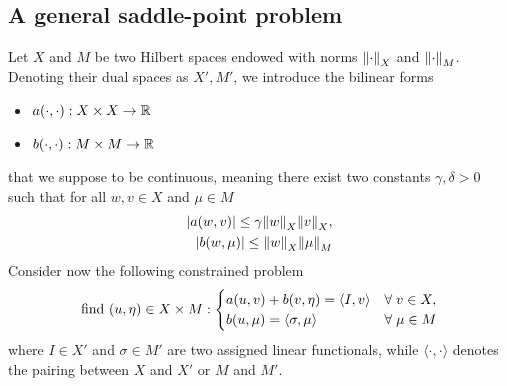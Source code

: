 \subsection{A general saddle-point problem}
Let \(X\) and \(M\) be two Hilbert spaces endowed with norms \(\norm{\cdot}_X\) and \(\norm{\cdot}_M\). Denoting their dual spaces as \(X', M'\), we introduce the bilinear forms 
\begin{itemize}
    \item \(a(\cdot, \cdot) : X\times X \to \mathbb{R}\) 
    \item \(b(\cdot, \cdot): M\times M \to \mathbb{R}\)
\end{itemize}
that we suppose to be continuous, meaning there exist two constants \(\gamma,\delta > 0\) such that for all \(w, v \in X\) and \(\mu \in M\)
\begin{equation}
    \begin{aligned}
        \abs{a(w,v)} \leq \gamma \norm{w}_X \norm{v}_X, \\
        \abs{b(w,\mu)} \leq \norm{w}_X \norm{\mu}_M
    \end{aligned}
    \label{21_slide_ns}
\end{equation}
Consider now the following constrained problem 
\begin{equation}
    \text{find } (u,\eta) \in X \times M:
    \begin{cases}
        a(u,v) + b(v, \eta) = \langle I, v \rangle & \forall \; v \in X, \\
        b(u,\mu) = \langle \sigma, \mu\rangle & \forall \; \mu \in M
    \end{cases}
    \label{22_slide_ns}
\end{equation}
where \(I \in X'\) and \(\sigma \in M'\) are two assigned linear functionals, while \(\langle \cdot, \cdot \rangle\) denotes the pairing between \(X\) and \(X'\) or \(M\) and \(M'\).

